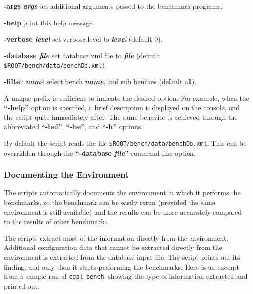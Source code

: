 \begin{list}{}
  {
    \setlength{\topsep}{0pt}
    \setlength{\partopsep}{0pt}
    \setlength{\parskip}{0pt}
    \setlength{\parsep}{0pt}
    \setlength{\itemsep}{0pt}
    \setlength{\itemindent}{0pt}
    \setlength{\leftmargin}{0.2\textwidth}
    \setlength{\labelsep}{0pt}
    \setlength{\labelwidth}{0.2\textwidth}
    \settowidth{\listparindent}{abc}
  }
\item[\textbf{ -args {\em args}}\hfill]
  set additional arguments passed to the benchmark programs.
\item[\textbf{-help}\hfill]  
  print this help message.
\item[\textbf{-verbose {\em level}}\hfill]  
  set verbose level to \textbf{\em level} (default 0).
\item[\textbf{-database {\em file}}\hfill]  
  set database xml file to \textbf{\em file} (default
  {\tt \$ROOT/bench/data/benchDb.xml}).
\item[\textbf{-filter {\em name}}\hfill]  
  select bench \textbf{\em name}, and sub benches (default all).
\end{list}
  
A unique prefix is sufficient to indicate the desired
option. For example, when the \textbf{``-help''} option is specified, 
a brief description is displayed on the console, and the script quits
immediately after. The same behavior is achieved through the
abbreviated \textbf{``-hel''}, \textbf{``-he''}, and \textbf{``-h''}
options.

By default the script reads the file
{\tt \$ROOT/bench/data/benchDb.xml}. This can be overridden through
the \textbf{``-database {\em file}''} command-line option.

\subsubsection{Documenting the Environment}
The scripts automatically documents the environment in which it
performs the benchmarks, so the benchmark can be easily rerun
(provided the same environment is still available) and the 
results can be more accurately compared to the results of other
benchmarks.

The scripts extract most of the information directly from the
environment. Additional configuration data that cannot be extracted
directly from the environment is extracted from the  database input
file. The script prints out its finding, and only then it starts
performing the benchmarks. Here is an excerpt from a sample run of
{\tt cgal\_bench}, showing the type of information extracted and
printed out.

